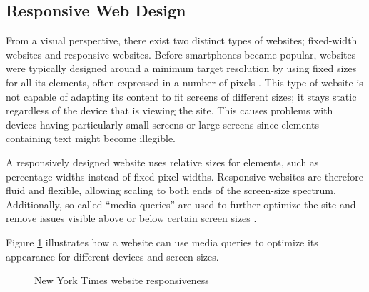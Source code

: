 \documentclass[a4paper,12pt]{article}
\begin{document}
\subsection{Responsive Web Design}
\label{Theory_responsiveWeb}
From a visual perspective, there exist two distinct types of websites; fixed-width websites and responsive websites. Before smartphones became popular, websites were typically designed around a minimum target resolution by using fixed sizes for all its elements, often expressed in a number of pixels \cite{resp_web_2011}. This type of website is not capable of adapting its content to fit screens of different sizes; it stays static regardless of the device that is viewing the site. This causes problems with devices having particularly small screens or large screens since elements containing text might become illegible.

A responsively designed website uses relative sizes for elements, such as percentage widths instead of fixed pixel widths. Responsive websites are therefore fluid and flexible, allowing scaling to both ends of the screen-size spectrum. Additionally, so-called “media queries” are used to further optimize the site and remove issues visible above or below certain screen sizes \cite{resp_web_2011}.

Figure \ref{fig:responsiveness} illustrates how a website can use media queries to optimize its appearance for different devices and screen sizes.

\vspace{-10px}
\begin{figure}[h]%
	\centering
	\quad
	\caption{New York Times website responsiveness}%
	\label{fig:responsiveness}%
\end{figure}
\vspace{-10px}
\end{document}
